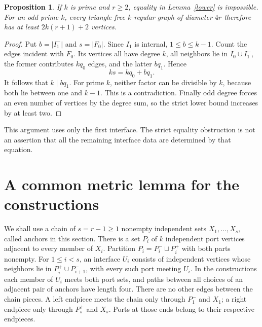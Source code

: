 \documentclass[11pt]{article}
\newtheorem{proposition}[theorem]{Proposition}
\begin{document}
\begin{proposition}\label{primeobstruction}
If $k$ is prime and $r\geq2$, equality in Lemma~\ref{lower} is
impossible. For an odd prime $k$, every triangle-free $k$-regular
graph of diameter $4r$ therefore has at least $2k(r+1)+2$ vertices.
\end{proposition}
\begin{proof}
Put $b=|I_1^-|$ and $s=|F_0|$. Since $I_1$ is internal,
$1\leq b\leq k-1$. Count the edges incident with $F_0$. Its vertices
all have degree $k$, all neighbors lie in $I_0\cup I_1^-$, the former
contributes $kq_0$ edges, and the latter $bq_1$. Hence
\[
 ks=kq_0+bq_1.
\]
It follows that $k\mid bq_1$. For prime $k$, neither factor can be
divisible by $k$, because both lie between one and $k-1$. This is a
contradiction. Finally odd degree forces an even number of vertices
by the degree sum, so the strict lower bound increases by at least two.
\end{proof}

This argument uses only the first interface. The strict equality
obstruction is not an assertion that all the remaining interface data
are determined by that equation.

\section{A common metric lemma for the constructions}

We shall use a chain of $s=r-1\geq1$ nonempty independent sets
$X_1,\ldots,X_s$, called anchors in this section. There is a set $P_i$
of $k$ independent port vertices adjacent to every member of $X_i$.
Partition $P_i=P_i^-\sqcup P_i^+$ with both parts nonempty. For
$1\leq i<s$, an interface $U_i$ consists of independent vertices
whose neighbors lie in $P_i^+\cup P_{i+1}^-$, with every such port
meeting $U_i$. In the constructions each member of $U_i$ meets both
port sets, and paths between all choices of an adjacent pair of
anchors have length four. There are no other edges between the chain
pieces. A left endpiece meets the chain only through $P_1^-$ and
$X_1$; a right endpiece only through $P_s^+$ and $X_s$. Ports at those
ends belong to their respective endpieces.
\end{document}
